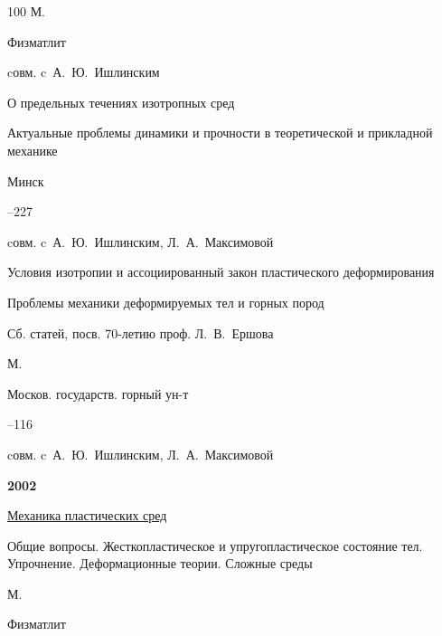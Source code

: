 \begin{thebibliography}{100}
\publaddr М.

\publ Физматлит 



\miscnote cовм. c~А.~Ю.~Ишлинским





\paper О предельных течениях изотропных сред 

\inbook Актуальные проблемы динамики и прочности в теоретической и прикладной механике

\publaddr Минск


–227 

\miscnote cовм. c~А.~Ю.~Ишлинским, Л.~А.~Максимовой




\paper Условия изотропии и ассоциированный закон пластического деформирования 

\inbook Проблемы механики деформируемых тел и горных пород

\bookinfo Сб. статей, посв. 70-летию проф. Л.~В.~Ершова

\publaddr М.

\publ Москов. государств. горный ун-т


–116 

\miscnote cовм. c~А.~Ю.~Ишлинским, Л.~А.~Максимовой



\item[] \centerline{\bf 2002}




\book \href{http://elibrary.ru/item.asp?id=24056562}{Механика пластических сред}


\volinfo Общие вопросы. Жесткопластическое и упругопластическое состояние тел. Упрочнение. Деформационные теории. Сложные среды

\publaddr М.

\publ Физматлит









\end{thebibliography}
